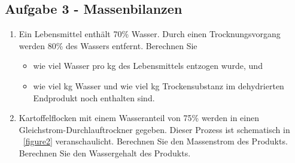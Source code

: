 \documentclass[a4paper,11pt]{article}
\newif\ifshowme
\begin{document}
\subsection*{Aufgabe 3 - Massenbilanzen}
\begin{enumerate}[leftmargin=6mm,font={\bfseries \sffamily \color{uniblau!75!black}},label=\alph*)]
\item Ein Lebensmittel enthält 70\% Wasser. Durch einen Trocknungsvorgang werden 80\% des Wassers entfernt. Berechnen Sie 
\begin{itemize}
\item wie viel Wasser pro kg des Lebensmittels entzogen wurde, und
\item wie viel kg Wasser und wie viel kg Trockensubstanz im dehydrierten Endprodukt noch enthalten sind.
%
%
%
%    
%
%
%
\end{itemize}


\ifshowme
\antwort{
Entferntes Wasser:
\begin{align*}
1~\text{kg} \cdot 0,7 \cdot 0,8 = 0,56~\text{kg}
\end{align*}
Wasseranteil im Lebensmittel:
\begin{align*}
0,7~\text{kg} - 0,56~\text{kg} = 0,14~\text{kg}
\end{align*}
Trockensubstanz im Lebensmittel:
\begin{align*}
1~\text{kg} \cdot 0,3 = 0,3~\text{kg}
\end{align*}
}
\pagebreak
\else
\fi

\ppbig

\item Kartoffelflocken mit einem Wasseranteil von 75\% werden in einen Gleich\-strom-Durchlauftrockner gegeben. Dieser Prozess ist schematisch in \mbox{\figurename{ \ref{figure2}}} veranschaulicht. Berechnen Sie den Massenstrom des Produkts. Berechnen Sie den Wassergehalt des Produkts.



\end{enumerate}
\end{document}
